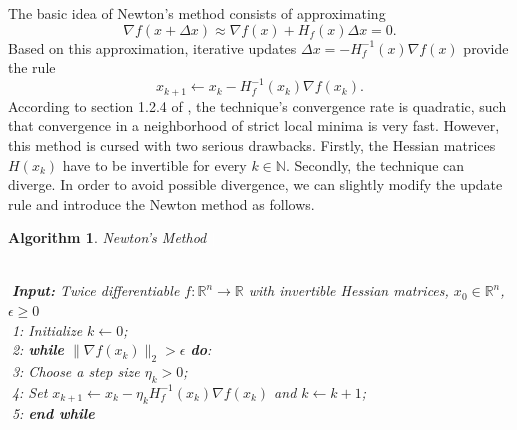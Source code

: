 \documentclass[11pt, a4paper]{article}
\newtheorem{algorithm}[theorem]{Algorithm}
\newcommand{\N}{\mathbb{N}}
\newcommand{\R}{\mathbb{R}}
\begin{document}
The basic idea of Newton's method consists of approximating
\[ \nabla f(x+ \Delta x) \approx \nabla f(x) + H_f(x) \Delta x = 0. \]
Based on this approximation, iterative updates $ \Delta x = - H_f^{-1}(x) \nabla f(x)$ provide the rule
\[ x_{k+1} \leftarrow x_k - H_f^{-1}(x_k) \nabla f(x_k). \]
According to section 1.2.4 of \cite{ConvexOptimization}, the technique's convergence rate is quadratic, such that convergence in a neighborhood of strict local minima is very fast. However, this method is cursed with two serious drawbacks. Firstly, the Hessian matrices $H(x_k)$ have to be invertible for every $k \in \N$. Secondly, the technique can diverge. In order to avoid possible divergence, we can slightly modify the update rule and introduce the Newton method as follows.


\begin{algorithm}
\caption{Newton's Method \textcolor{white}{$\Big |$}} \ \\
\textcolor{white}{$\Big |$}\textbf{Input:} Twice differentiable $f: \R^n \to \R$ with invertible Hessian matrices, $x_0 \in \R^n$, $\epsilon \geq 0$ \\
\textcolor{white}{$\Big |$}1: Initialize $k \leftarrow 0$; \\
\textcolor{white}{$\Big |$}2: \textbf{while} $ \big \| \nabla f(x_k) \big \|_2 > \epsilon $ \textbf{do}: \\
\textcolor{white}{$\Big |$}3: \quad Choose a step size $\eta_k > 0$; \\
\textcolor{white}{$\Big |$}4: \quad Set $x_{k+1} \leftarrow x_k - \eta_k H_f^{-1}(x_k) \nabla f(x_k)$ and $k \leftarrow k+1$; \\
\textcolor{white}{$\Big |$}5: \textbf{end while}
\end{algorithm}
\ \\
\end{document}
